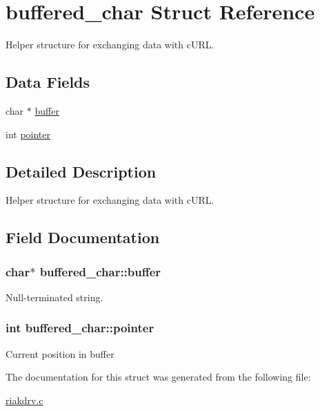 \hypertarget{structbuffered__char}{
\section{buffered\_\-char Struct Reference}
\label{structbuffered__char}
}


Helper structure for exchanging data with cURL.  


\subsection*{Data Fields}
\begin{DoxyCompactItemize}
\item 
char $\ast$ \hyperlink{structbuffered__char_a759de684707699359a0c31d5e125f6a0}{buffer}
\item 
int \hyperlink{structbuffered__char_a2f7425884f415035f4dcd8340e9600b4}{pointer}
\end{DoxyCompactItemize}


\subsection{Detailed Description}
Helper structure for exchanging data with cURL. 

\subsection{Field Documentation}
\hypertarget{structbuffered__char_a759de684707699359a0c31d5e125f6a0}{
\subsubsection[{buffer}]{\setlength{\rightskip}{0pt plus 5cm}char$\ast$ {\bf buffered\_\-char::buffer}}}
\label{structbuffered__char_a759de684707699359a0c31d5e125f6a0}
Null-\/terminated string. \hypertarget{structbuffered__char_a2f7425884f415035f4dcd8340e9600b4}{
\subsubsection[{pointer}]{\setlength{\rightskip}{0pt plus 5cm}int {\bf buffered\_\-char::pointer}}}
\label{structbuffered__char_a2f7425884f415035f4dcd8340e9600b4}
Current position in buffer 

The documentation for this struct was generated from the following file:\begin{DoxyCompactItemize}
\item 
\hyperlink{riakdrv_8c}{riakdrv.c}\end{DoxyCompactItemize}

